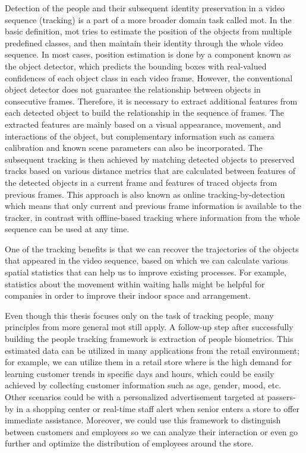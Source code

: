 \begin{introduction}
    Detection of the people and their subsequent identity preservation in a video sequence (tracking) is a part of a more broader domain task called \gls{mot}. In the basic definition, \gls{mot} tries to estimate the position of the objects from multiple predefined classes, and then maintain their identity through the whole video sequence. In most cases, position estimation is done by a component known as the object detector, which predicts the bounding boxes with real-valued confidences of each object class in each video frame. However, the conventional object detector does not guarantee the relationship between objects in consecutive frames. Therefore, it is necessary to extract additional features from each detected object to build the relationship in the sequence of frames. The extracted features are mainly based on a visual appearance, movement, and interactions of the object, but complementary information such as camera calibration and known scene parameters can also be incorporated. The subsequent tracking is then achieved by matching detected objects to preserved tracks based on various distance metrics that are calculated between features of the detected objects in a current frame and features of traced objects from previous frames. This approach is also known as online tracking-by-detection which means that only current and previous frame information is available to the tracker, in contrast with offline-based tracking where information from the whole sequence can be used at any time. 
    
    One of the tracking benefits is that we can recover the trajectories of the objects that appeared in the video sequence, based on which we can calculate various spatial statistics that can help us to improve existing processes. For example, statistics about the movement within waiting halls might be helpful for companies in order to improve their indoor space and arrangement. 
    
    Even though this thesis focuses only on the task of tracking people, many principles from more general \gls{mot} still apply. A follow-up step after successfully building the people tracking framework is extraction of people biometrics. This estimated data can be utilized in many applications from the retail environment; for example, we can utilize them in a retail store where is the high demand for learning customer trends in specific days and hours, which could be easily achieved by collecting customer information such as age, gender, mood, etc. Other scenarios could be with a personalized advertisement targeted at passers-by in a shopping center or real-time staff alert when senior enters a store to offer immediate assistance. Moreover, we could use this framework to distinguish between customers and employees so we can analyze their interaction or even go further and optimize the distribution of employees around the store.
    

\end{introduction}
